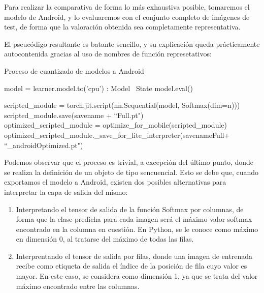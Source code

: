 Para realizar la comparativa de forma lo más exhaustiva posible, tomaremos el modelo de Android, y lo evaluaremos con el conjunto completo de imágenes de test, de forma que la valoración obtenida sea completamente representativa.

El pseucódigo resultante es batante sencillo, y su explicación queda prácticamente autocontenida gracias al uso de nombres de función represetativos:

\begin{algorithm}[H]
	\label{fig:cuantizado}
	\caption{Proceso de cuantizado de modelos a Android}
	\begin{algorithmic}
	
		\State model = learner.model.to('cpu') : Model
		\ State model.eval()
		
		 \State scripted\_module = torch.jit.script(nn.Sequential(model, Softmax(dim=n))) \\
	 	 \State scripted\_module.save(savename + ``Full.pt")\\  
		 \State optimized\_scripted\_module = optimize\_for\_mobile(scripted\_module) 
		 \State optimized\_scripted\_module.\_save\_for\_lite\_interpreter(savenameFull+ ``\_androidOptimized.pt")
	
		\EndProcedure
		
	\end{algorithmic}
\end{algorithm}

Podemos observar que el proceso es trivial, a excepción del último punto, donde se realiza la definición de un objeto de tipo sencuencial. Esto se debe que, cuando exportamos el modelo a Android, existen dos posibles alternativas para interpretar la capa de salida del mismo:
\begin{enumerate}
	\item Interpretando el tensor de salida de la función Softmax por columnas, de forma que la clase predicha para cada imagen será el máximo valor softmax encontrado en la columna en cuestión. En Python, se le conoce como máximo en dimensión 0, al tratarse del máximo de todas las filas.
	\item Interprentando el tensor de salida por filas, donde una imagen de entrenada recibe como etiqueta de salida el índice de la posición de fila cuyo valor es mayor. En este caso, se considera como dimensión 1, ya que se trata del valor máximo encontrado entre las columnas.
 \end{enumerate}

